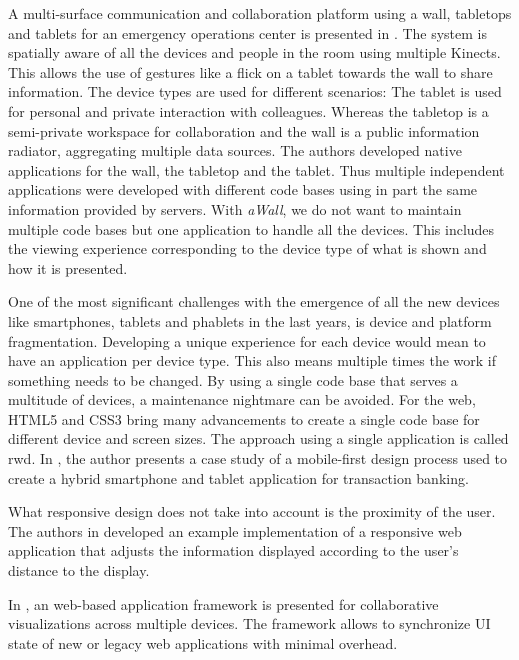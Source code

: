 \documentclass{sigchi}
\begin{document}
A multi-surface communication and collaboration platform using a wall, tabletops and tablets for an emergency operations center is presented in \cite{Chokshi:2014:EMM:2669485.2669520}. 
The system is spatially aware of all the devices and people in the room using multiple Kinects.
This allows the use of gestures like a flick on a tablet towards the wall to share information.
The device types are used for different scenarios:
The tablet is used for personal and private interaction with colleagues.
Whereas the tabletop is a semi-private workspace for collaboration and the wall is a public information radiator, aggregating multiple data sources.
The authors developed native applications for the wall, the tabletop and the tablet.
Thus multiple independent applications were developed with different code bases using in part the same information provided by servers.
With \textit{aWall}, we do not want to maintain multiple code bases but one application to handle all the devices.
This includes the viewing experience corresponding to the device type of what is shown and how it is presented.


One of the most significant challenges with the emergence of all the new devices like smartphones, tablets and phablets in the last years, is device and platform fragmentation.
Developing a unique experience for each device would mean to have an application per device type.
This also means multiple times the work if something needs to be changed. 
By using a single code base that serves a multitude of devices, a maintenance nightmare can be avoided.
For the web, HTML5 and CSS3 bring many advancements to create a single code base for different device and screen sizes.
The approach using a single application is called \gls{rwd}.
In \cite{Pandey:2013:RDT:2525194.2525271}, the author presents a case study of a mobile-first design process used to create a hybrid smartphone and tablet application for transaction banking.

What responsive design does not take into account is the proximity of the user. 
The authors in \cite{Sukale:2014:PWD:2638728.2638768} developed an example implementation of a responsive web application that adjusts the information displayed according to the user's distance to the display.

In \cite{Badam:2014:PCF:2669485.2669518}, an web-based application framework is presented for collaborative visualizations across multiple devices. The framework allows to synchronize UI state of new or legacy web applications with minimal overhead.
\end{document}
